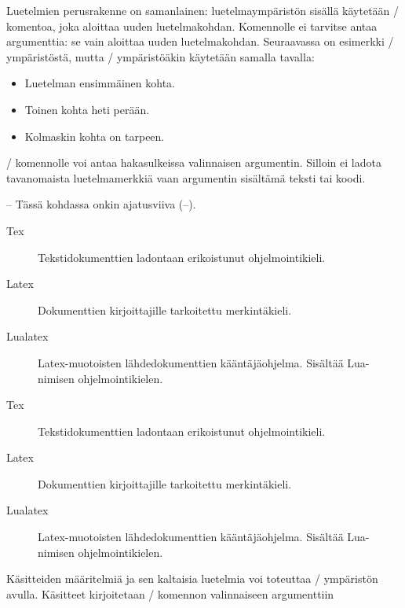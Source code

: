 Luetelmien perusrakenne on samanlainen: luetelmaympäristön sisällä
käytetään \-/ komentoa, joka aloittaa uuden
luetelmakohdan. Komennolle ei tarvitse antaa argumenttia: se vain
aloittaa uuden luetelmakohdan. Seuraavassa on esimerkki
\-/ ympäristöstä, mutta \-/
ympäristöäkin käytetään samalla tavalla:

\begin{koodilohkosis}
\begin{itemize}
\item Luetelman ensimmäinen kohta.
\item Toinen kohta heti perään.
\item Kolmaskin kohta on tarpeen.
\end{itemize}
\end{koodilohkosis}

\-/ komennolle voi antaa hakasulkeissa valinnaisen
argumentin. Silloin ei ladota tavanomaista luetelmamerkkiä vaan
argumentin sisältämä teksti tai koodi.

\begin{koodilohkosis}
\item[--] Tässä kohdassa onkin ajatusviiva (--).
\end{koodilohkosis}

\begin{esimerkki*}

\begin{koodilohko}
\begin{description}
\item[Tex] Tekstidokumenttien ladontaan erikoistunut ohjelmointikieli.
\item[Latex] Dokumenttien kirjoittajille tarkoitettu merkintäkieli.
\item[Lualatex] Latex-muotoisten lähdedokumenttien kääntäjäohjelma.
  Sisältää Lua-nimisen ohjelmointikielen.
\end{description}
\end{koodilohko}

  \begin{tulos}
    \begin{description}
    \item[Tex] Tekstidokumenttien ladontaan erikoistunut ohjelmointikieli.
    \item[Latex] Dokumenttien kirjoittajille tarkoitettu merkintäkieli.
    \item[Lualatex] Latex-muotoisten lähdedokumenttien kääntäjäohjelma.
      Sisältää Lua-nimi\-sen ohjelmointikielen.
    \end{description}
  \end{tulos}
  \caption{Käsitteiden määritelmiä ja sen kaltaisia luetelmia voi
    toteuttaa \-/ ympäristön avulla. Käsitteet
    kirjoitetaan \-/ komennon valinnaiseen argumenttiin}
  \label{esim/description}
\end{esimerkki*}


